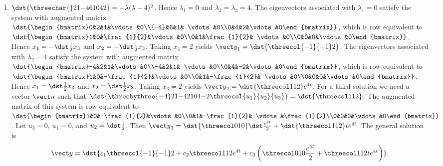 \documentclass[openany]{book}
\newenvironment{sectionSolutions}{
 \begin{enumerate}[item-label={\thesection.\arabic{enumi}.}]
}{
 \end{enumerate}
}
\begin{document}
\begin{sectionSolutions}
\item
$\dst{\threechar{}21{-4}61042}
=-\lambda(\lambda-4)^2$.
Hence $\lambda_1=0$ and  $\lambda_2=\lambda_3=4$.
The eigenvectors associated
 with $\lambda_1=0$ satisfy the system with  augmented matrix
$\dst{\begin{bmatrix}0&2&1&\vdots&0\\{-4}&6&1&
\vdots&0\\0&4&2&\vdots&0\end{bmatrix}}$,
which is row equivalent to
$\dst{\begin{bmatrix}1&0&\frac{1}{2}&\vdots&0\\0&1&\frac{1}{2}&
\vdots&0\\0&0&0&\vdots&0\end{bmatrix}}$.
Hence  $x_1=-\dst\frac{1}{2}x_3$ and $x_2=-\dst\frac{1}{2}x_3$.  Taking $x_3=2$
yields
${\vect y}_1=\dst{\threecol{-1}{-1}2}$.
The eigenvectors associated
 with $\lambda_2=4$ satisfy the system with  augmented matrix
$\dst{\begin{bmatrix}-4&2&1&\vdots&0\\-4&2&1&
\vdots&0\\0&4&-2&\vdots&0\end{bmatrix}}$,
which is row equivalent to
$\dst{\begin{bmatrix}1&0&-\frac{1}{2}&\vdots&0\\0&1&-\frac{1}{2}&
\vdots&0\\0&0&0&\vdots&0\end{bmatrix}}$.
Hence  $x_1=\dst\frac{1}{2}x_3$ and $x_2=\dst\frac{1}{2}x_3$.  Taking
$x_3=2$ yields
${\vect y}_2=\dst{\threecol112}e^{4t}$.
For a third solution we need a vector ${\vect u}$ such that
$\dst{\threebythree{-4}21{-4}2104{-2}\threecol{u_1}{u_2}{u_3}}=\dst{\threecol112}$.
The augmented matrix of this system is row equivalent to
$\dst{\begin{bmatrix}1&0&-\frac{1}{2}&\vdots&0\\0&1&-\frac{1}{2}&
\vdots&\frac{1}{2}\\0&0&0&\vdots&0\end{bmatrix}}$.
Let  $u_3=0$, $u_1=0$, and $u_2=\dst\frac{1}{2}$. Then
${\vect
y}_3=\dst{\threecol010}\dst\frac{e^{4t}}{2}+\dst{\threecol112}te^{4t}$.
The general solution is
\[
{\vect y}=\dst{
c_1\threecol{-1}{-1}2+c_2\threecol112e^{4t}+
c_3\left(\threecol010\frac{e^{4t}}{2}+\threecol112te^{4t}\right)}.
\]



\end{sectionSolutions}
\end{document}

